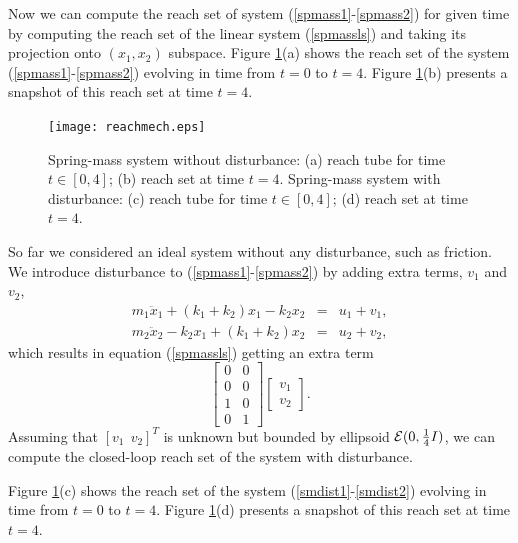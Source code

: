 \documentclass{report}
\newcommand{\EE}{{\cal E}}
\begin{document}
Now we can compute the reach set of system (\ref{spmass1}-\ref{spmass2})
for given time by computing the reach set of the linear system (\ref{spmassls})
and taking its projection onto $(x_1, x_2)$ subspace.
\newpage
{}
Figure \ref{mechreachfig}(a) shows the reach set of the system
(\ref{spmass1}-\ref{spmass2}) evolving in time from $t=0$ to $t=4$.
Figure \ref{mechreachfig}(b) presents a snapshot of this reach set at time
$t=4$.
\begin{figure}%
\centerline{
\texttt{[image: reachmech.eps]}}
\caption{Spring-mass system without disturbance:
(a) reach tube for time $t\in[0,4]$; (b) reach set at time $t=4$.
Spring-mass system with disturbance:
(c) reach tube for time $t\in[0,4]$; (d) reach set at time $t=4$.}
\label{mechreachfig}
\end{figure}

So far we considered an ideal system without any disturbance, such as friction.
We introduce disturbance to (\ref{spmass1}-\ref{spmass2}) by adding extra
terms, $v_1$ and $v_2$,
\begin{eqnarray}
m_1\ddot{x}_1+(k_1+k_2)x_1-k_2x_2 & = & u_1 + v_1, \label{smdist1}\\
m_2\ddot{x}_2-k_2x_1+(k_1+k_2)x_2 & = & u_2 + v_2, \label{smdist2}
\end{eqnarray}
which results in equation (\ref{spmassls}) getting an extra term
\[ \left[\begin{array}{cc}
0 & 0\\
0 & 0\\
1 & 0\\
0 & 1\end{array}\right]\left[\begin{array}{c}
v_1\\
v_2\end{array}\right]. \]
Assuming that $[v_1 ~~ v_2]^T$ is unknown but bounded by ellipsoid
$\EE(0, \frac{1}{4}I)$, we can compute the closed-loop reach set of the system
with disturbance.

Figure \ref{mechreachfig}(c) shows the reach set of the system
(\ref{smdist1}-\ref{smdist2}) evolving in time from $t=0$ to $t=4$.
Figure \ref{mechreachfig}(d) presents a snapshot of this reach set at time
$t=4$.
\end{document}
